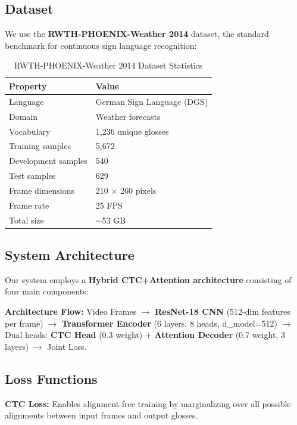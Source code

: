\documentclass[12pt,a4paper]{article}
\begin{document}
\subsection{Dataset}

We use the \textbf{RWTH-PHOENIX-Weather 2014} dataset, the standard benchmark for continuous sign language recognition:

\begin{table}[H]
\centering
\caption{RWTH-PHOENIX-Weather 2014 Dataset Statistics}
\label{tab:dataset}
\begin{tabular}{@{}ll@{}}
\toprule
\textbf{Property} & \textbf{Value} \\
\midrule
Language & German Sign Language (DGS) \\
Domain & Weather forecasts \\
Vocabulary & 1,236 unique glosses \\
Training samples & 5,672 \\
Development samples & 540 \\
Test samples & 629 \\
Frame dimensions & 210 $\times$ 260 pixels \\
Frame rate & 25 FPS \\
Total size & $\sim$53 GB \\
\bottomrule
\end{tabular}
\end{table}

\subsection{System Architecture}

Our system employs a \textbf{Hybrid CTC+Attention architecture} consisting of four main components:

\textbf{Architecture Flow:} Video Frames $\rightarrow$ \textbf{ResNet-18 CNN} (512-dim features per frame) $\rightarrow$ \textbf{Transformer Encoder} (6 layers, 8 heads, d\_model=512) $\rightarrow$ Dual heads: \textbf{CTC Head} (0.3 weight) + \textbf{Attention Decoder} (0.7 weight, 3 layers) $\rightarrow$ Joint Loss.

\subsection{Loss Functions}

\textbf{CTC Loss:} Enables alignment-free training by marginalizing over all possible alignments between input frames and output glosses.
\end{document}
